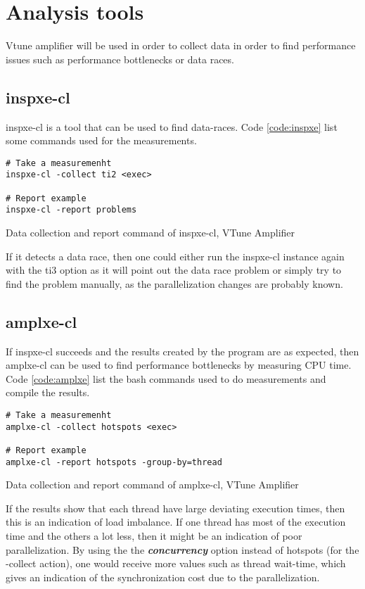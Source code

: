 \documentclass[journal]{IEEEtran}
\begin{document}
\section{Analysis tools}
\label{sec:analysis}
Vtune amplifier will be used in order to collect data in order to find performance issues such as performance bottlenecks or data races.
\subsection{inspxe-cl}
\label{sec:inspxe}
inspxe-cl is a tool that can be used to find data-races. Code \ref{code:inspxe} list some commands used for the measurements.

\begin{code}[here]
  \begin{lstlisting}[style=bash]
# Take a measuremenht
inspxe-cl -collect ti2 <exec>
  
# Report example
inspxe-cl -report problems
  \end{lstlisting}
  \caption{Data collection and report command of inspxe-cl, VTune Amplifier}
  \label{code:inspxe}
\end{code}

If it detects a data race, then one could either run the inspxe-cl instance again with the ti3 option as it will point out the data race problem or simply try to find the problem manually, as the parallelization changes are probably known.

\subsection{amplxe-cl}
\label{sec:amplxe}
If inspxe-cl succeeds and the results created by the program are as expected, then amplxe-cl can be used to find performance bottlenecks by measuring CPU time. Code \ref{code:amplxe} list the bash commands used to do measurements and compile the results.

\begin{code}[here]
  \begin{lstlisting}[style=bash]
# Take a measuremenht
amplxe-cl -collect hotspots <exec>
  
# Report example
amplxe-cl -report hotspots -group-by=thread
  \end{lstlisting}
  \caption{Data collection and report command of amplxe-cl, VTune Amplifier}
  \label{code:amplxe}
\end{code}

If the results show that each thread have large deviating execution times, then this is an indication of load imbalance. If one thread has most of the execution time and the others a lot less, then it might be an indication of poor parallelization. By using the the \textbf{\emph{concurrency}} option instead of hotspots (for the -collect action), one would receive more values such as thread wait-time, which gives an indication of the synchronization cost due to the parallelization.
\end{document}
